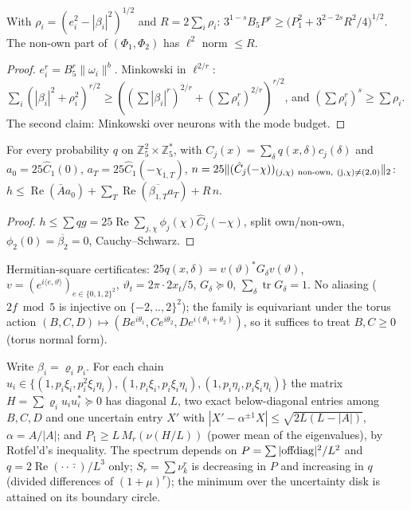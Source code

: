 \documentclass[11pt]{article}
\begin{document}
\begin{lemma}  With $\rho_i=(e_i^2-|\beta_i|^2)^{1/2}$ and $R=2\sum_i\rho_i$:
$3^{1-s}B_5P^s\ge\big(P_1^2+3^{2-2s}R^2/4\big)^{1/2}$.  The non-own part of $(\Phi_1,\Phi_2)$ has $\ell^2$ norm $\le R$.\end{lemma}
\begin{proof} $e_i^r=B_5^r\|\omega_i\|^b$.  Minkowski in $\ell^{2/r}$: $\sum_i(|\beta_i|^2+\rho_i^2)^{r/2}\ge((\sum|\beta_i|^r)^{2/r}+(\sum\rho_i^r)^{2/r})^{r/2}$, and $(\sum\rho_i^r)^{s}\ge\sum\rho_i$.
The second claim: Minkowski over neurons with the mode budget.\end{proof}

\begin{lemma}[certificates]  For every probability $q$ on $\mathbb Z_5^2\times\mathbb Z_5^\ast$, with $C_j(x)=\sum_\delta q(x,\delta)c_j(\delta)$ and
$a_0=25\hat C_1(0)$, $a_T=25\hat C_1(-\chi_{1,T})$, $n=25\|(\hat C_j(-\chi))_{(j,\chi)\ \rm non\text{-}own,\ (j,\chi)\ne(2,0)}\|_2$:
$h\le\operatorname{Re}(\bar A a_0)+\sum_T\operatorname{Re}(\overline{\beta_{1,T}}a_T)+R\,n$.\end{lemma}
\begin{proof} $h\le\sum q g=25\operatorname{Re}\sum_{j,\chi}\phi_j(\chi)\hat C_j(-\chi)$, split own/non-own, $\phi_2(0)=\overline{\beta_2}=0$, Cauchy--Schwarz.\end{proof}

Hermitian-square certificates: $25q(x,\delta)=v(\vartheta)^\ast G_\delta v(\vartheta)$, $v=(e^{i\langle e,\vartheta\rangle})_{e\in\{0,1,2\}^2}$, $\vartheta_t=2\pi\cdot2x_t/5$,
$G_\delta\succeq0$, $\sum_\delta\operatorname{tr}G_\delta=1$.  No aliasing ($2f\bmod5$ is injective on $\{-2,..,2\}^2$); the family is equivariant under the torus action
$(B,C,D)\mapsto(Be^{i\theta_1},Ce^{i\theta_2},De^{i(\theta_1+\theta_2)})$, so it suffices to treat $B,C\ge0$ (torus normal form).

\begin{lemma}  Write $\beta_i=\varrho_ip_i$.  For each chain $u_i\in\{(1,p_i\xi_i,p_i^2\xi_i\eta_i),(1,p_i\xi_i,p_i\xi_i\eta_i),(1,p_i\eta_i,p_i\xi_i\eta_i)\}$
the matrix $H=\sum\varrho_iu_iu_i^\ast\succeq0$ has diagonal $L$, two exact below-diagonal entries among $B,C,D$ and one uncertain entry $X'$ with
$|X'-\alpha^{\pm1}X|\le\sqrt{2L(L-|A|)}$, $\alpha=A/|A|$; and $P_1\ge L\,M_r(\nu(H/L))$ (power mean of the eigenvalues), by Rotfel'd's inequality.
The spectrum depends on $P=\sum|{\rm offdiag}|^2/L^2$ and $q=2\operatorname{Re}(\cdot\cdot\bar\cdot)/L^3$ only; $S_r=\sum\nu_k^r$ is decreasing in $P$ and increasing in $q$
(divided differences of $(1+\mu)^r$); the minimum over the uncertainty disk is attained on its boundary circle.\end{lemma}
\end{document}
